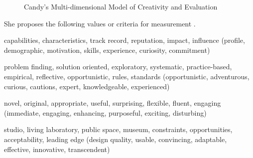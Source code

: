 \begin{figure}[!htbp]
  \caption[Candy's MMCE]{Candy's Multi-dimensional Model of Creativity and Evaluation}
  \label{fig:mmce}
\end{figure}

She proposes the following values or criteria for measurement \autocite*{Candy2012}.

\begin{description}[leftmargin=1.8cm]
  \item [People] capabilities, characteristics, track record, reputation, impact, influence (profile, demographic, motivation, skills, experience, curiosity, commitment)
  \item [Process] problem finding, solution oriented, exploratory, systematic, practice-based, empirical, reflective, opportunistic, rules, standards (opportunistic, adventurous, curious, cautions, expert, knowledgeable, experienced)
  \item [Product] novel, original, appropriate, useful, surprising, flexible, fluent, engaging (immediate, engaging, enhancing, purposeful, exciting, disturbing)
  \item [Context] studio, living laboratory, public space, museum, constraints, opportunities, acceptability, leading edge (design quality, usable, convincing, adaptable, effective, innovative, transcendent)
\end{description}


